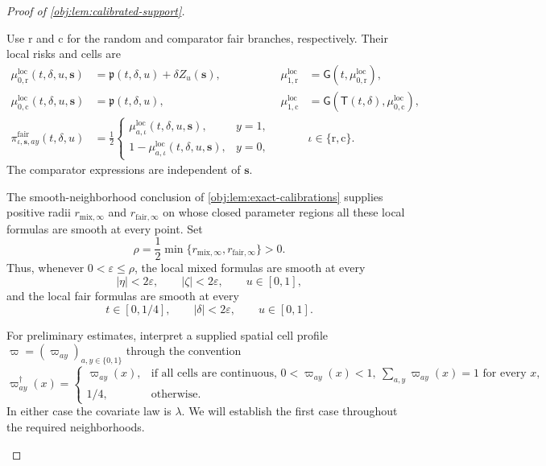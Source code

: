 \begin{proof}[Proof of \cref{obj:lem:calibrated-support}]
\begin{enumerate}
Use \(\mathrm r\) and \(\mathrm c\) for the random and comparator fair branches, respectively. Their local risks and cells are
\[
\begin{aligned}
\mu^{\mathrm{loc}}_{0,\mathrm r}(t,\delta,u,\mathbf s)
&=\mathfrak p(t,\delta,u)+\delta Z_u(\mathbf s),&
\mu^{\mathrm{loc}}_{1,\mathrm r}
&=\mathsf G(t,\mu^{\mathrm{loc}}_{0,\mathrm r}),\\
\mu^{\mathrm{loc}}_{0,\mathrm c}(t,\delta,u,\mathbf s)
&=\mathfrak p(t,\delta,u),&
\mu^{\mathrm{loc}}_{1,\mathrm c}
&=\mathsf G(\mathsf T(t,\delta),\mu^{\mathrm{loc}}_{0,\mathrm c}),\\
\pi^{\mathrm{fair}}_{\iota,\mathbf s,ay}(t,\delta,u)
&=\frac12
\begin{cases}
\mu^{\mathrm{loc}}_{a,\iota}(t,\delta,u,\mathbf s),&y=1,\\
1-\mu^{\mathrm{loc}}_{a,\iota}(t,\delta,u,\mathbf s),&y=0,
\end{cases}
&&\iota\in\{\mathrm r,\mathrm c\}.
\end{aligned}
\]
The comparator expressions are independent of \(\mathbf s\).

The smooth-neighborhood conclusion of
\cref{obj:lem:exact-calibrations} supplies positive radii
\(r_{\mathrm{mix},\infty}\) and \(r_{\mathrm{fair},\infty}\) on whose closed parameter regions all these local formulas are smooth at every point. Set
\[
\rho=\frac12\min\{r_{\mathrm{mix},\infty},
                         r_{\mathrm{fair},\infty}\}>0.
\]
Thus, whenever \(0<\varepsilon\le\rho\), the local mixed formulas are smooth at every
\[
|\eta|<2\varepsilon,\qquad |\zeta|<2\varepsilon,\qquad u\in[0,1],
\]
and the local fair formulas are smooth at every
\[
t\in[0,1/4],\qquad |\delta|<2\varepsilon,\qquad u\in[0,1].
\]

For preliminary estimates, interpret a supplied spatial cell profile
\(\varpi=(\varpi_{ay})_{a,y\in\{0,1\}}\) through the convention
\[
\varpi^\dagger_{ay}(x)=
\begin{cases}
\varpi_{ay}(x),
&\text{if all cells are continuous, }
  0<\varpi_{ay}(x)<1,\ \sum_{a,y}\varpi_{ay}(x)=1
  \text{ for every }x,\\
1/4,&\text{otherwise}.
\end{cases}
\]
In either case the covariate law is \(\lambda\).
We will establish the first case throughout the required neighborhoods.


\end{enumerate}
\end{proof}
